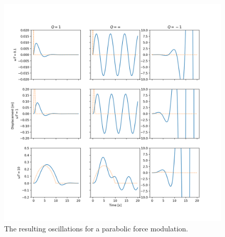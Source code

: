 \begin{figure}
    \centering
    \includegraphics[width=.7\linewidth,keepaspectratio]{figures/Q3_omega_q_plot.png}
    \caption{The resulting oscillations for a parabolic force modulation. }
    \label{fig:fig_Q3}
\end{figure}